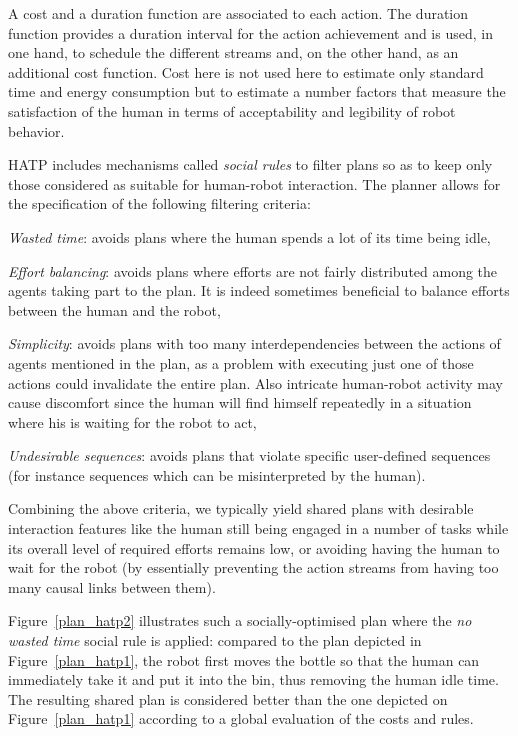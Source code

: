 \documentclass[preprint,3p,times]{elsarticle}
\begin{document}
A cost and a duration function are associated to each action.  The duration
function provides a duration interval for the action achievement and is used, in
one hand, to schedule the different streams and, on the other hand, as an
additional cost function. Cost here is not used here to estimate only standard time and energy consumption but
to estimate a number factors that measure the satisfaction of the human in terms of acceptability and legibility of robot behavior.  

HATP includes mechanisms called \emph{social rules} to filter plans so as to
keep only those considered as suitable for human-robot interaction. The planner
allows for the specification of the following filtering criteria:

\emph{Wasted time}: avoids plans where the human spends a lot
of its time being idle,

\emph{Effort balancing}: avoids plans where efforts are
not fairly distributed among the agents taking part to the plan.  It is
indeed sometimes beneficial to balance efforts between the human and
the robot,

\emph{Simplicity}: avoids plans with too many interdependencies
between the actions of agents mentioned in the plan, as a problem with
executing just one of those actions could invalidate the entire
plan. Also intricate human-robot activity may cause discomfort since
the human will find himself repeatedly in a situation where his is
waiting for the robot to act,

\emph{Undesirable sequences}: avoids plans that violate specific user-defined
sequences (for instance sequences which can be misinterpreted by the human).

Combining the above criteria, we typically yield shared plans with desirable
interaction features like the human still being engaged in a number of tasks
while its overall level of required efforts remains low, or avoiding having the
human to wait for the robot (by essentially preventing the action streams from
having too many causal links between them).

Figure~\ref{plan_hatp2} illustrates such a socially-optimised plan where the
\emph{no wasted time} social rule is applied: compared to the plan depicted in
Figure~\ref{plan_hatp1}, the robot first moves the bottle so that the human can
immediately take it and put it into the bin, thus removing the human idle time.
The resulting shared plan is considered better than the one depicted on
Figure~\ref{plan_hatp1} according to a global evaluation of the costs and rules.
\end{document}
